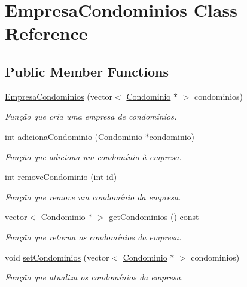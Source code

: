 \hypertarget{class_empresa_condominios}{}\section{Empresa\+Condominios Class Reference}
\label{class_empresa_condominios}
\subsection*{Public Member Functions}
\begin{DoxyCompactItemize}
\item 
\hyperlink{class_empresa_condominios_a70b22bc9c4109a5de1a1fb2348cedd9d}{Empresa\+Condominios} (vector$<$ \hyperlink{class_condominio}{Condominio} $\ast$ $>$ condominios)
\begin{DoxyCompactList}\small\item\em Função que cria uma empresa de condomínios. \end{DoxyCompactList}\item 
int \hyperlink{class_empresa_condominios_a88f7bd8f0d17dcfdd346da4fa689ba53}{adiciona\+Condominio} (\hyperlink{class_condominio}{Condominio} $\ast$condominio)
\begin{DoxyCompactList}\small\item\em Função que adiciona um condomínio à empresa. \end{DoxyCompactList}\item 
int \hyperlink{class_empresa_condominios_a3cd1b44048bbe35005ca39c9bc1628a5}{remove\+Condominio} (int id)
\begin{DoxyCompactList}\small\item\em Função que remove um condomínio da empresa. \end{DoxyCompactList}\item 
vector$<$ \hyperlink{class_condominio}{Condominio} $\ast$ $>$ \hyperlink{class_empresa_condominios_af4475e3de96fe4f78b9de51da3dbb227}{get\+Condominios} () const 
\begin{DoxyCompactList}\small\item\em Função que retorna os condomínios da empresa. \end{DoxyCompactList}\item 
void \hyperlink{class_empresa_condominios_a9729cd6ee8a91c40cb73b294480f7c70}{set\+Condominios} (vector$<$ \hyperlink{class_condominio}{Condominio} $\ast$ $>$ condominios)
\begin{DoxyCompactList}\small\item\em Função que atualiza os condomínios da empresa. \end{DoxyCompactList}\end{DoxyCompactItemize}


